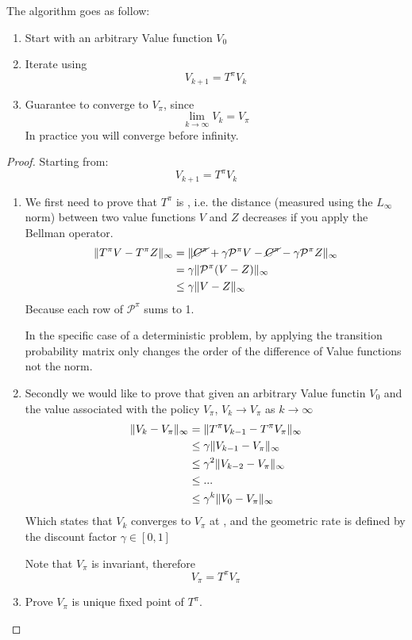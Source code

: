 The algorithm goes as follow:
\begin{enumerate}
\item Start with an arbitrary Value function $V_0$
\item Iterate using
\[V_{k+1} = T^{\pi}V_k\]
\item Guarantee to converge to $V_{\pi}$, since
\[\lim_{k\to\infty} V_k = V_{\pi}\]
In practice you will converge before infinity.
\end{enumerate}

\begin{proof}
Starting from:
\[V_{k+1} = T^{\pi}V_k\]
\begin{enumerate}
\item We first need to prove that $T^\pi$ is ,  i.e. the distance (measured using the $L_{\infty}$ norm) between two value functions $V$ and $Z$ decreases if you apply the Bellman operator.
\begin{align*}
\lVert T^{\pi}V - T^{\pi}Z\rVert_{\infty} &= \lVert\cancel{C^{\pi}}+\gamma \mathcal{P}^{\pi}V - \cancel{C^{\pi}} - \gamma \mathcal{P}^{\pi}Z\rVert_{\infty}\\
&= \gamma \lVert\mathcal{P}^{\pi}(V-Z)\rVert_{\infty}\\
&\le \gamma \lVert V-Z\rVert_{\infty}
\end{align*}
Because each row of $\mathcal{P}^{\pi}$ sums to 1.

In the specific case of a deterministic problem, by applying the transition probability matrix only changes the order of the difference of Value functions not the norm.

\item Secondly we would like to prove that given an arbitrary Value functin $V_0$ and the value associated with the policy $V_{\pi}$, $V_{k}\to V_{\pi}$ as $k\to\infty$
\begin{align*}
\lVert V_k - V_{\pi}\rVert_{\infty} &= \lVert T^{\pi}V_{k-1} - T^{\pi}V_{\pi}\rVert_{\infty} \\
&\le\gamma\lVert V_{k-1} - V_{\pi}\rVert_{\infty} \\
&\le \gamma^2 \lVert V_{k-2} - V_{\pi}\rVert_{\infty}\\
&\le ...\\
&\le \gamma^k \lVert V_{0}-V_{\pi}\rVert_{\infty}
\end{align*}
Which states that $V_{k}$ converges to $V_{\pi}$ at , and the geometric rate is defined by the discount factor $\gamma \in [0,1]$

Note that $V_{\pi}$ is invariant, therefore 
\[V_{\pi} = T^{\pi}V_{\pi}\]
\item Prove $V_{\pi}$ is unique fixed point of $T^{\pi}$.


\end{enumerate}
\end{proof}
